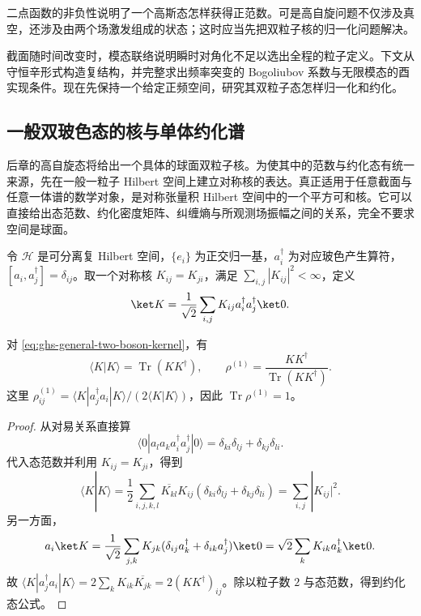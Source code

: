 二点函数的非负性说明了一个高斯态怎样获得正范数。可是高自旋问题不仅涉及真空，还涉及由两个场激发组成的状态；这时应当先把双粒子核的归一化问题解决。




截面随时间改变时，模态联络说明瞬时对角化不足以选出全程的粒子定义。下文从守恒辛形式构造复结构，并完整求出频率突变的 Bogoliubov 系数与无限模态的酉实现条件。现在先保持一个给定正频空间，研究其双粒子态怎样归一化和约化。

\subsection{一般双玻色态的核与单体约化谱}

后章的高自旋态将给出一个具体的球面双粒子核。为使其中的范数与约化态有统一来源，先在一般一粒子 Hilbert 空间上建立对称核的表达。真正适用于任意截面与任意一体谱的数学对象，是对称张量积 Hilbert 空间中的一个平方可和核。它可以直接给出态范数、约化密度矩阵、纠缠熵与所观测场振幅之间的关系，完全不要求空间是球面。


令 $\mathscr H$ 是可分离复 Hilbert 空间，$\{e_i\}$ 为正交归一基，$a_i^\dagger$ 为对应玻色产生算符，$[a_i,a_j^\dagger]=\delta_{ij}$。取一个对称核 $K_{ij}=K_{ji}$，满足 $\sum_{i,j}|K_{ij}|^2<\infty$，定义
\begin{equation}\label{eq:ghs-general-two-boson-kernel}
 \ket K=\frac1{\sqrt2}\sum_{i,j}K_{ij}a_i^\dagger a_j^\dagger\ket0.
\end{equation}

\begin{theorem}[精确范数和单体约化态]
\label{thm:ghs-two-boson-kernel-density}
对 \cref{eq:ghs-general-two-boson-kernel}，有
\begin{equation}\label{eq:ghs-kernel-norm-density}
 \langle K|K\rangle=\operatorname{Tr}(KK^\dagger),\qquad
 \rho^{(1)}=\frac{KK^\dagger}{\operatorname{Tr}(KK^\dagger)}.
\end{equation}
这里 $\rho^{(1)}_{ij}=\langle K|a_j^\dagger a_i|K\rangle/(2\langle K|K\rangle)$，因此 $\operatorname{Tr}\rho^{(1)}=1$。
\end{theorem}
\begin{proof}
从对易关系直接算
\[
 \langle0|a_l a_k a_i^\dagger a_j^\dagger|0\rangle
 =\delta_{ki}\delta_{lj}+\delta_{kj}\delta_{li}.
\]
代入态范数并利用 $K_{ij}=K_{ji}$，得到
\[
 \langle K|K\rangle=\frac12\sum_{i,j,k,l}
 \overline{K_{kl}}K_{ij}(\delta_{ki}\delta_{lj}+\delta_{kj}\delta_{li})
 =\sum_{i,j}|K_{ij}|^2.
\]
另一方面，
\[
 a_i\ket K=\frac1{\sqrt2}\sum_{j,k}K_{jk}
 (\delta_{ij}a_k^\dagger+\delta_{ik}a_j^\dagger)\ket0
 =\sqrt2\sum_kK_{ik}a_k^\dagger\ket0.
\]
故 $\langle K|a_j^\dagger a_i|K\rangle=2\sum_k K_{ik}\overline{K_{jk}}=2(KK^\dagger)_{ij}$。除以粒子数 $2$ 与态范数，得到约化态公式。
\end{proof}


